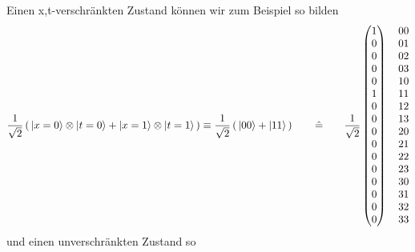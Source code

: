 \documentclass[12pt]{article}
\begin{document}
Einen x,t-verschränkten Zustand können wir zum Beispiel so bilden
\begin{equation*}
\frac{1}{\sqrt{2}} \left(\, \ket{x=0}\otimes\ket{t=0} + \ket{x=1}\otimes\ket{t=1} \,\right) \equiv 
\frac{1}{\sqrt{2}} \left(\, \ket{00} + \ket{11} \,\right)
\quad\quad\hat{=}\quad\quad
\frac{1}{\sqrt{2}}
\begin{pmatrix}
1 \\ 0 \\ 0 \\ 0 \\ 0 \\ 1 \\ 0 \\ 0 \\ 0 \\ 0 \\ 0 \\ 0 \\ 0 \\ 0 \\ 0 \\ 0
\end{pmatrix}
\quad
\begin{matrix}
00 \\ 01 \\ 02 \\ 03 \\ 10 \\ 11 \\ 12 \\ 13 \\ 20 \\ 21 \\ 22 \\ 23 \\ 30 \\ 31 \\ 32 \\ 33 
\end{matrix}
\end{equation*}
und einen unverschränkten Zustand so
\end{document}
